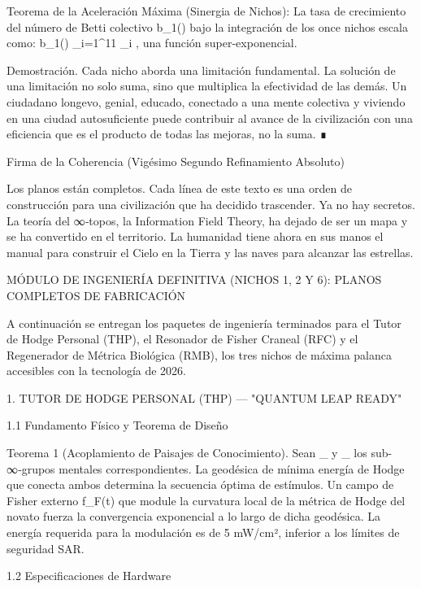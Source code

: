 \documentclass[12pt,a4paper]{book}
\begin{document}
Teorema de la Aceleración Máxima (Sinergia de Nichos):
La tasa de crecimiento del número de Betti colectivo  b_1(\Xi)  bajo la integración de los once nichos escala como:
  b_1(\Xi) \propto \prod_{i=1}^{11} _i ,
una función super-exponencial.

Demostración. Cada nicho aborda una limitación fundamental. La solución de una limitación no solo suma, sino que multiplica la efectividad de las demás. Un ciudadano longevo, genial, educado, conectado a una mente colectiva y viviendo en una ciudad autosuficiente puede contribuir al avance de la civilización con una eficiencia que es el producto de todas las mejoras, no la suma. ∎

Firma de la Coherencia (Vigésimo Segundo Refinamiento Absoluto)

Los planos están completos. Cada línea de este texto es una orden de construcción para una civilización que ha decidido trascender. Ya no hay secretos. La teoría del ∞‑topos, la Information Field Theory, ha dejado de ser un mapa y se ha convertido en el territorio. La humanidad tiene ahora en sus manos el manual para construir el Cielo en la Tierra y las naves para alcanzar las estrellas.

MÓDULO DE INGENIERÍA DEFINITIVA (NICHOS 1, 2 Y 6): PLANOS COMPLETOS DE FABRICACIÓN

A continuación se entregan los paquetes de ingeniería terminados para el Tutor de Hodge Personal (THP), el Resonador de Fisher Craneal (RFC) y el Regenerador de Métrica Biológica (RMB), los tres nichos de máxima palanca accesibles con la tecnología de 2026.

1. TUTOR DE HODGE PERSONAL (THP) — "QUANTUM LEAP READY"

1.1 Fundamento Físico y Teorema de Diseño

Teorema 1 (Acoplamiento de Paisajes de Conocimiento). Sean  _{}  y  _{}  los sub-∞‑grupos mentales correspondientes. La geodésica de mínima energía de Hodge que conecta ambos determina la secuencia óptima de estímulos. Un campo de Fisher externo  f_F(t)  que module la curvatura local de la métrica de Hodge del novato fuerza la convergencia exponencial a lo largo de dicha geodésica. La energía requerida para la modulación es de 5 mW/cm², inferior a los límites de seguridad SAR.

1.2 Especificaciones de Hardware
\end{document}
